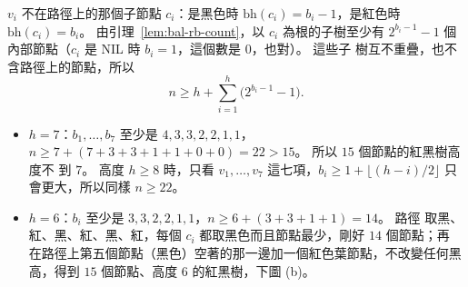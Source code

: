 $v_i$ 不在路徑上的那個子節點 $c_i$：是黑色時 $\mathrm{bh}(c_i) = b_i - 1$，是紅色時
$\mathrm{bh}(c_i) = b_i$。 由引理~\ref{lem:bal-rb-count}，以 $c_i$ 為根的子樹至少有
$2^{b_i - 1} - 1$ 個內部節點（$c_i$ 是 NIL 時 $b_i = 1$，這個數是 $0$，也對）。 這些子
樹互不重疊，也不含路徑上的節點，所以
\[
n \ge h + \sum_{i=1}^{h} \bigl(2^{b_i - 1} - 1\bigr).
\]
\begin{itemize}
\item $h = 7$：$b_1, \ldots, b_7$ 至少是 $4, 3, 3, 2, 2, 1, 1$，
$n \ge 7 + (7 + 3 + 3 + 1 + 1 + 0 + 0) = 22 > 15$。 所以 $15$ 個節點的紅黑樹高度不
到 $7$。 高度 $h \ge 8$ 時，只看 $v_1, \ldots, v_7$ 這七項，$b_i \ge 1 + \lfloor (h-i)/2 \rfloor$ 只會更大，所以同樣 $n \ge 22$。
\item $h = 6$：$b_i$ 至少是 $3, 3, 2, 2, 1, 1$，$n \ge 6 + (3 + 3 + 1 + 1) = 14$。 路徑
取黑、紅、黑、紅、黑、紅，每個 $c_i$ 都取黑色而且節點最少，剛好 $14$ 個節點；再
在路徑上第五個節點（黑色）空著的那一邊加一個紅色葉節點，不改變任何黑高，得到
$15$ 個節點、高度 $6$ 的紅黑樹，下圖 (b)。
\end{itemize}
